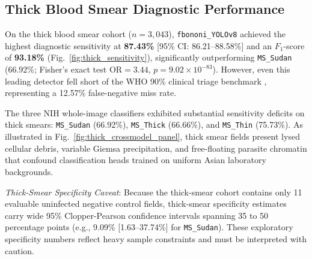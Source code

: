 \documentclass[10pt,journal,compsoc]{IEEEtran}
\begin{document}
\subsection{Thick Blood Smear Diagnostic Performance}
On the thick blood smear cohort ($n=3,043$), \texttt{fbononi\_YOLOv8} achieved the highest diagnostic sensitivity at \textbf{87.43\%} [95\% CI: 86.21--88.58\%] and an $F_1$-score of \textbf{93.18\%} (Fig.~\ref{fig:thick_sensitivity}), significantly outperforming \texttt{MS\_Sudan} (66.92\%; Fisher's exact test $\text{OR} = 3.44$, $p = 9.02 \times 10^{-83}$). However, even this leading detector fell short of the WHO 90\% clinical triage benchmark \cite{who2016malaria}, representing a 12.57\% false-negative miss rate.

The three NIH whole-image classifiers exhibited substantial sensitivity deficits on thick smears: \texttt{MS\_Sudan} (66.92\%), \texttt{MS\_Thick} (66.66\%), and \texttt{MS\_Thin} (75.73\%). As illustrated in Fig.~\ref{fig:thick_crossmodel_panel}, thick smear fields present lysed cellular debris, variable Giemsa precipitation, and free-floating parasite chromatin that confound classification heads trained on uniform Asian laboratory backgrounds.

\textit{Thick-Smear Specificity Caveat}: Because the thick-smear cohort contains only 11 evaluable uninfected negative control fields, thick-smear specificity estimates carry wide 95\% Clopper-Pearson confidence intervals spanning 35 to 50 percentage points (e.g., 9.09\% [1.63--37.74\%] for \texttt{MS\_Sudan}). These exploratory specificity numbers reflect heavy sample constraints and must be interpreted with caution.
\end{document}
